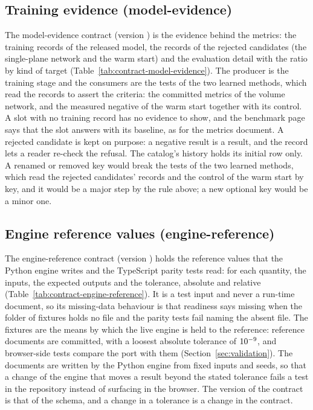 

\subsection{Training evidence (model-evidence)}\label{sec:data-model-evidence}

The model-evidence contract (version ) is the evidence behind the metrics: the training records of the released model, the records of the rejected candidates (the single-plane network and the warm start) and the evaluation detail with the ratio by kind of target (Table~\ref{tab:contract-model-evidence}). The producer is the training stage and the consumers are the tests of the two learned methods, which read the records to assert the criteria: the committed metrics of the volume network, and the measured negative of the warm start together with its control. A slot with no training record has no evidence to show, and the benchmark page says that the slot answers with its baseline, as for the metrics document. A rejected candidate is kept on purpose: a negative result is a result, and the record lets a reader re-check the refusal. The catalog's history holds its initial row only. A renamed or removed key would break the tests of the two learned methods, which read the rejected candidates' records and the control of the warm start by key, and it would be a major step by the rule above; a new optional key would be a minor one.



\subsection{Engine reference values (engine-reference)}\label{sec:data-engine-reference}

The engine-reference contract (version ) holds the reference values that the Python engine writes and the TypeScript parity tests read: for each quantity, the inputs, the expected outputs and the tolerance, absolute and relative (Table~\ref{tab:contract-engine-reference}). It is a test input and never a run-time document, so its missing-data behaviour is that readiness says missing when the folder of fixtures holds no file and the parity tests fail naming the absent file. The fixtures are the means by which the live engine is held to the reference: \liveFixtures{} reference documents are committed, with a loosest absolute tolerance of $10^{-9}$, and \liveTests{} browser-side tests compare the port with them (Section~\ref{sec:validation}). The documents are written by the Python engine from fixed inputs and seeds, so that a change of the engine that moves a result beyond the stated tolerance fails a test in the repository instead of surfacing in the browser. The version of the contract is that of the schema, and a change in a tolerance is a change in the contract.

